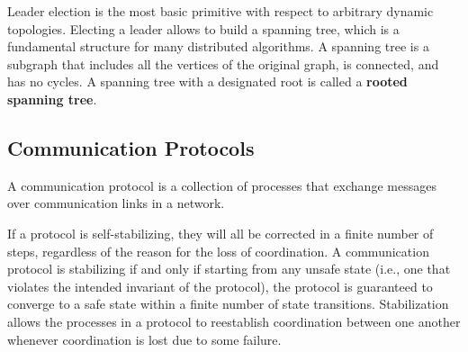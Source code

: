 Leader election is the most basic primitive with respect to arbitrary dynamic topologies.
Electing a leader allows to build a spanning tree, which is a fundamental structure for many distributed algorithms.
A spanning tree is a subgraph that includes all the vertices of the original graph, is connected, and has no cycles.
A spanning tree with a designated root is called a \textbf{rooted spanning tree}.


\subsection{Communication Protocols}

A communication protocol is a collection of processes that exchange messages
over communication links in a network.

If a protocol is self-stabilizing, they will all be corrected in a finite number of steps,
regardless of the reason for the loss of coordination.
A communication protocol is stabilizing if and only if starting from any unsafe state
(i.e., one that violates the intended invariant of the protocol), the protocol is
guaranteed to converge to a safe state within a finite number of state transitions.
Stabilization allows the processes in a protocol to reestablish coordination between one another whenever coordination is lost due to some failure.


